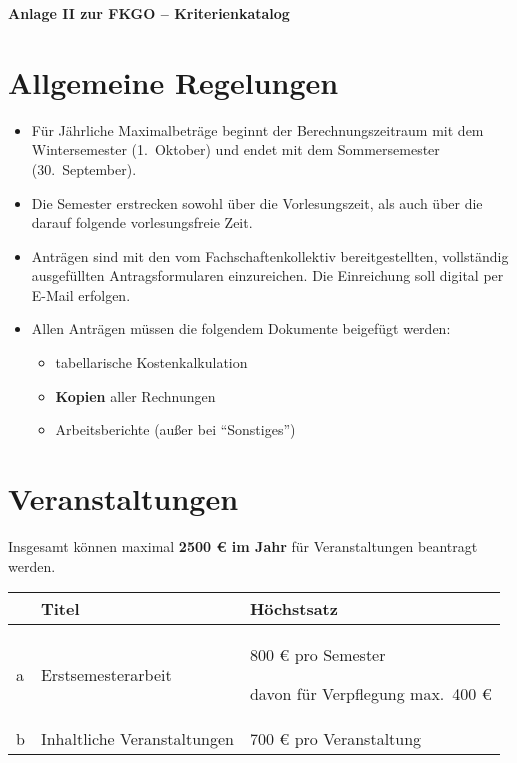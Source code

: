\documentclass{article}
\begin{document}
\noindent
\begin{center}
    \huge \textbf{Anlage II zur FKGO -- Kriterienkatalog}
\end{center}

\section{Allgemeine Regelungen}
    \begin{itemize}
        \item Für Jährliche Maximalbeträge beginnt der Berechnungszeitraum mit dem Wintersemester (1.\ Oktober) und endet mit dem Sommersemester (30.\ September).
        \item Die Semester erstrecken sowohl über die Vorlesungszeit, als auch über die darauf folgende vorlesungsfreie Zeit.
        \item Anträgen sind mit den vom Fachschaftenkollektiv bereitgestellten, vollständig ausgefüllten Antragsformularen einzureichen. 
        	Die Einreichung soll digital per E-Mail erfolgen.
        \item Allen Anträgen müssen die folgendem Dokumente beigefügt werden:
        \begin{itemize}
            \item tabellarische Kostenkalkulation
            \item \textbf{Kopien} aller Rechnungen
            \item Arbeitsberichte (außer bei  "`Sonstiges"')
        \end{itemize}
    \end{itemize}

\section{Veranstaltungen}
    Insgesamt können maximal \textbf{2500 € im Jahr} für Veranstaltungen beantragt werden. \\
    
    \setlength\extrarowheight{2mm} \sffamily    
    \begin{tabular}{l||L{6cm}|L{7cm}}

         &\textbf{Titel}  & \textbf{Höchstsatz} \\[1mm] \hline \hline
         a&
         Erstsemesterarbeit &
         800 € pro Semester\par
         davon für Verpflegung max.\ 400 € \\[1mm] \hline
          
        b&
        Inhaltliche Veranstaltungen & 
        700 € pro Veranstaltung \\[1mm]
        
    \end{tabular}
    \rmfamily
\end{document}

